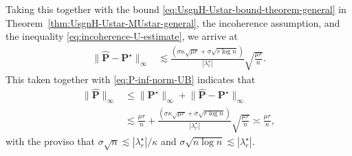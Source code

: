 %
Taking this  together with the bound \eqref{eq:UsgnH-Ustar-bound-theorem-general} in Theorem~\ref{thm:UsgnH-Ustar-MUstar-general}, 
the incoherence assumption, and the inequality \eqref{eq:incoherence-U-estimate}, we arrive at
%
\begin{align}
	\big\|\widehat{\bm{P}}-\bm{P}^\star \big\|_{\infty} & \lesssim \frac{(\sigma\kappa\sqrt{\mu r}+\sigma\sqrt{r\log n})}{|\lambda_{r}^{\star}|} \sqrt{\frac{\mu r}{n}}. \label{eq:P-hat-Linf-norm-diff}
\end{align}
%
This taken together with \eqref{eq:P-inf-norm-UB} indicates that
%
\begin{align}
\big\|\widehat{\bm{P}}\big\|_{\infty} & \leq\big\|\bm{P}^\star \big\|_{\infty}+\big\|\widehat{\bm{P}}-\bm{P}^\star \big\|_{\infty}\nonumber \\
 & \lesssim \frac{\mu r}{n}+\frac{(\sigma\kappa\sqrt{\mu r}+\sigma\sqrt{r\log n})}{|\lambda_{r}^{\star}|}\sqrt{\frac{\mu r}{n}}\asymp\frac{\mu r}{n},\label{eq:P-hat-Linf-norm}
\end{align}
%
with the proviso that $\sigma\sqrt{n}\lesssim|\lambda_{r}^{\star}|/\kappa$ and $\sigma\sqrt{n\log n}\lesssim|\lambda_{r}^{\star}|$. 



